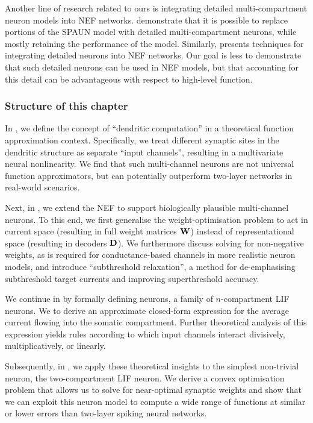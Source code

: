 Another line of research related to ours is integrating detailed multi-compartment neuron models into NEF networks.
 demonstrate that it is possible to replace portions of the SPAUN model \citep{eliasmith2012largescale} with detailed multi-compartment neurons, while mostly retaining the performance of the model. Similarly, \citet{duggins2017incorporating} presents techniques for integrating detailed neurons into NEF networks.
Our goal is less to demonstrate that such detailed neurons can be used in NEF models, but that accounting for this detail can be advantageous with respect to high-level function.

\subsubsection{Structure of this chapter}
In , we define the concept of \enquote{dendritic computation} in a theoretical function approximation context.
Specifically, we treat different synaptic sites in the dendritic structure as separate \enquote{input channels}, resulting in a multivariate neural nonlinearity.
We find that such multi-channel neurons are not universal function approximators, but can potentially outperform two-layer networks in real-world scenarios.

Next, in , we extend the NEF to support biologically plausible multi-channel neurons.
To this end, we first generalise the weight-optimisation problem to act in current space (resulting in full weight matrices $\mathbf{W}$) instead of representational space (resulting in decoders $\mathbf{D}$).
We furthermore discuss solving for non-negative weights, as is required for conductance-based channels in more realistic neuron models, and introduce \enquote{subthreshold relaxation}, a method for de-emphasising subthreshold target currents and improving superthreshold accuracy.

We continue in  by formally defining \nlif neurons, a family of $n$-compartment LIF neurons.
We to derive an approximate closed-form expression for the average current flowing into the somatic compartment.
Further theoretical analysis of this expression yields rules according to which input channels interact divisively, multiplicatively, or linearly.

Subsequently, in , we apply these theoretical insights to the simplest non-trivial \nlif neuron, the two-compartment LIF neuron.
We derive a convex optimisation problem that allows us to solve for near-optimal synaptic weights and show that we can exploit this neuron model to compute a wide range of functions at similar or lower errors than two-layer spiking neural networks.

